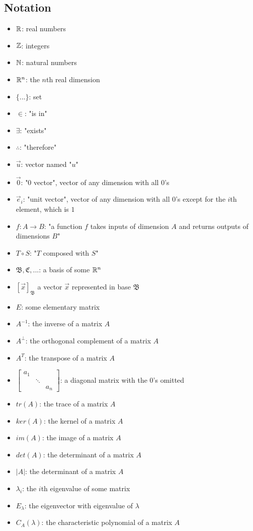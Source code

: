 \documentclass[12pt]{article}
\begin{document}
{{\subsection{Notation}
    \begin{itemize}
        \item $\mathbb{R}$: real numbers
        \item $\mathbb{Z}$: integers
        \item $\mathbb{N}$: natural numbers
        \item $\mathbb{R}^n$: the $n$th real dimension
        \item $\{...\}$: set
        \item $\in$: "is in"
        \item $\exists$: "exists"
        \item $\therefore$: "therefore"
        \item $\Vec{u}$: vector named "$u$"
        \item $\Vec{0}$: "0 vector", vector of any dimension with all $0$'s
        \item $\vec{e}_i$: "unit vector", vector of any dimension with all $0$'s except for the $i$th element, which is $1$
        \item $f: A \to B$: "a function $f$ takes inputs of dimension $A$ and returns outputs of dimensions $B$"
        \item $T \circ S$: "$T$ composed with $S$"
        \item $\mathfrak{B}, \mathfrak{C}, ...$: a basis of some $\mathbb{R}^n$
        \item $[\vec{x}]_{\mathfrak{B}}$ a vector $\vec{x}$ represented in base $\mathfrak{B}$
        \item $E$: some elementary matrix
       \item $A^{-1}$: the inverse of a matrix $A$
       \item $A^\bot$: the orthogonal complement of a matrix $A$
       \item $A^T$: the transpose of a matrix $A$
       \item $\begin{bmatrix}
           a_1 & \\
            & \ddots&\\
            & & a_n
         \end{bmatrix}$: a diagonal matrix with the $0$'s omitted
       \item $tr(A)$: the trace of a matrix $A$
       \item $ker(A)$: the kernel of a matrix $A$
       \item $im(A)$: the image of a matrix $A$
       \item $det(A)$: the determinant of a matrix $A$
       \item $|A|$: the determinant of a matrix $A$
       \item $\lambda_i$: the $i$th eigenvalue of some matrix
       \item $E_\lambda$: the eigenvector with eigenvalue of $\lambda$
       \item $C_A(\lambda)$: the characteristic polynomial of a matrix $A$
    \end{itemize}
\newpage
}}
\end{document}
